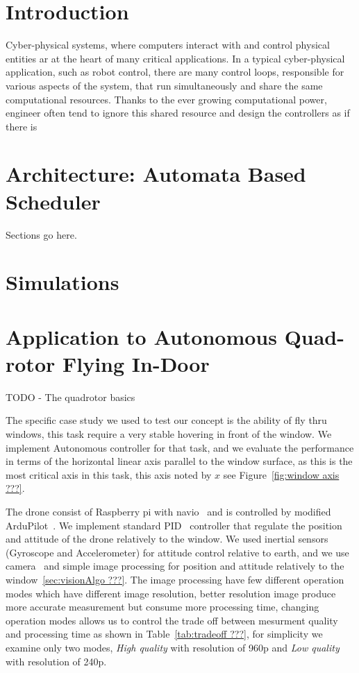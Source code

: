 \documentclass{sig-alternate-ipsn13}
\begin{document}
\section{Introduction}

Cyber-physical systems, where computers interact with and control physical entities ar at the heart of many critical applications. In a typical cyber-physical application, such as robot control, there are many control loops, responsible for various aspects of the system, that run simultaneously and share the same computational resources. Thanks to the ever growing computational power, engineer often tend to ignore this shared resource and design the controllers as if there is 


\section{Architecture: Automata Based Scheduler}

Sections go here.

\section{Simulations}
\label{sec:simulation}

\section{Application to Autonomous Quad-rotor Flying In-Door}

TODO - The quadrotor basics

The specific case study we used to test our concept is the ability of fly thru windows, this task require a very stable hovering in front of the window.
We implement Autonomous controller for that task, and we evaluate the performance in terms of the horizontal linear axis parallel to the window surface, as this is the most critical axis in this task, this axis noted by $x$ see Figure~\ref{fig:window axis ???}.

The drone consist of Raspberry pi with navio~\cite{??? raspberry, navio} and is controlled by modified ArduPilot~\cite{??? APM}.
We implement standard PID~\cite{??? PID} controller that regulate the position and attitude of the drone relatively to the window.
We used inertial sensors (Gyroscope and Accelerometer) for attitude control relative to earth, and we use camera~\cite{??? picam} and simple image processing for position and attitude relatively to the window~\ref{sec:visionAlgo ???}.
The image processing have few different operation modes which have different image resolution, better resolution image produce more accurate measurement but consume more processing time, changing operation modes allows us to control the trade off between mesurment quality and processing time as shown in Table~\ref{tab:tradeoff ???}, for simplicity we examine only two modes, \textit{High quality} with resolution of 960p and \textit{Low quality} with resolution of 240p.
\end{document}
